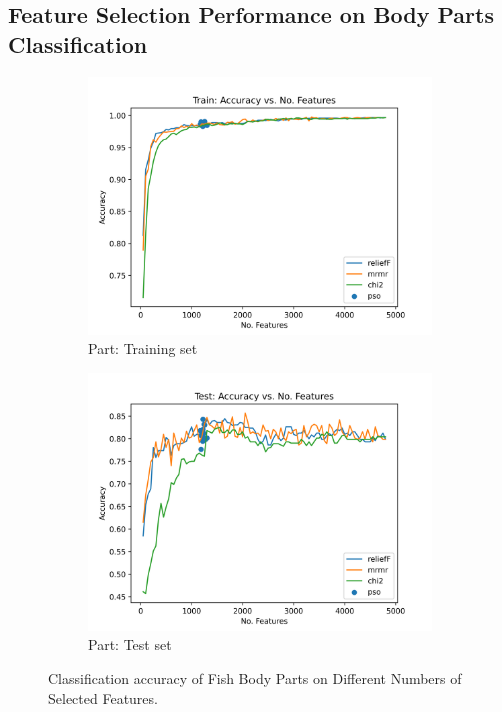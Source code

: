 \documentclass[runningheads]{llncs}
\begin{document}
\subsection{Feature Selection Performance on Body Parts Classification}

\begin{figure}[t]
  \centering
  \begin{subfigure}[b]{.45\linewidth}
    \includegraphics[width=\linewidth]{accuracy-features-part-train.png}
    \caption{Part: Training set}\label{fig:fs-per-k-part-part-train}
  \end{subfigure}
  \begin{subfigure}[b]{.45\linewidth}
    \includegraphics[width=\linewidth]{accuracy-features-part-test.png}
    \caption{Part: Test set}\label{fig:fs-per-k-part-part-test}
  \end{subfigure}
    \caption[Two numerical solutions]{
      Classification accuracy of Fish Body Parts on Different Numbers of Selected Features.
    }
  \label{fig:fs-per-k-part}
\end{figure}
\end{document}
